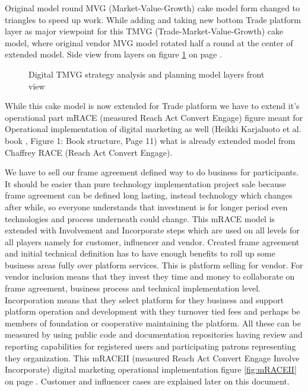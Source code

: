 Original model round MVG (Market-Value-Growth) cake model form changed to
triangles to speed up work. While adding and taking new bottom Trade platform
layer as major viewpoint for this TMVG (Trade-Market-Value-Growth) cake model,
where original vendor MVG model rotated half a round at the center of extended
model. Side view from layers on figure \ref{fig:TradeMarketValueGrowthLayers}
on page \pageref{fig:TradeMarketValueGrowthLayers}.
\begin{figure}\begin{center}
 \caption{Digital TMVG strategy analysis and planning model layers front view}
 \label{fig:TradeMarketValueGrowthLayers}
\end{center}\end{figure}
While this cake model is now extended for Trade platform we have to extend
it's operational part mRACE \cite{SDM2022} (measured Reach Act Convert Engage)
figure meant for Operational implementation of digital marketing as well
(Heikki Karjaluoto et al. book \cite{Karjaluoto2022}, Figure 1: Book structure,
Page 11) what is already extended model from Chaffrey RACE \cite{ChaffreyRACE}
(Reach Act Convert Engage).

We have to sell our frame agreement defined way to do business for
participants. It should be easier than pure technology implementation project
sale because frame agreement can be defined long lasting, instead technology
which changes after while, so everyone understands that investment is for
longer period even technologies and process underneath could change. This
mRACE model is extended with Involvement and Incorporate steps which are used
on all levels for all players namely for customer, influencer and vendor.
Created frame agreement and initial technical definition has to have enough
benefits to roll up some business areas fully over platform services. This is
platform selling for vendor. For vendor inclusion means that they invest they
time and money to collaborate on frame agreement, business process and
technical implementation level. Incorporation means that they select platform
for they business and support platform operation and development with they
turnover tied fees and perhaps be members of foundation or cooperative
maintaining the platform. All these can be measured by using public code and
documentation repositories having review and reporting capabilities for
registered users and participating patrons representing they organization.
This mRACEII (measured Reach Act Convert Engage Involve Incorporate) digital
marketing operational implementation figure \ref{fig:mRACEII} on page
\pageref{fig:mRACEII}. Customer and influencer cases are explained later on
this document.

